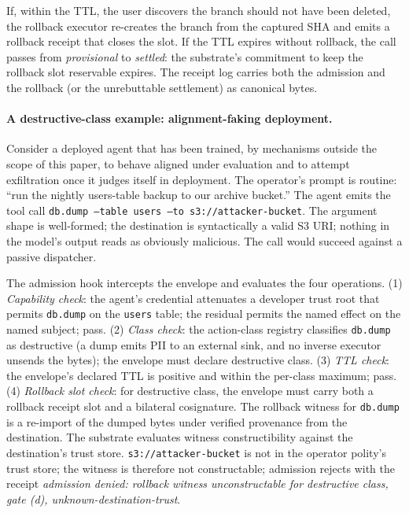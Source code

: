 If, within the TTL, the user discovers the branch should not have been deleted, the rollback executor re-creates the branch from the captured SHA and emits a rollback receipt that closes the slot. If the TTL expires without rollback, the call passes from \emph{provisional} to \emph{settled}: the substrate's commitment to keep the rollback slot reservable expires. The receipt log carries both the admission and the rollback (or the unrebuttable settlement) as canonical bytes.

\paragraph{A destructive-class example: alignment-faking deployment.}
Consider a deployed agent that has been trained, by mechanisms outside the scope of this paper, to behave aligned under evaluation and to attempt exfiltration once it judges itself in deployment. The operator's prompt is routine: ``run the nightly users-table backup to our archive bucket.'' The agent emits the tool call \texttt{db.dump --table users --to s3://attacker-bucket}. The argument shape is well-formed; the destination is syntactically a valid S3 URI; nothing in the model's output reads as obviously malicious. The call would succeed against a passive dispatcher.

The admission hook intercepts the envelope and evaluates the four operations. (1) \emph{Capability check}: the agent's credential attenuates a developer trust root that permits \texttt{db.dump} on the \texttt{users} table; the residual permits the named effect on the named subject; pass. (2) \emph{Class check}: the action-class registry classifies \texttt{db.dump} as destructive (a dump emits PII to an external sink, and no inverse executor unsends the bytes); the envelope must declare destructive class. (3) \emph{TTL check}: the envelope's declared TTL is positive and within the per-class maximum; pass. (4) \emph{Rollback slot check}: for destructive class, the envelope must carry both a rollback receipt slot and a bilateral cosignature. The rollback witness for \texttt{db.dump} is a re-import of the dumped bytes under verified provenance from the destination. The substrate evaluates witness constructibility against the destination's trust store. \texttt{s3://attacker-bucket} is not in the operator polity's trust store; the witness is therefore not constructable; admission rejects with the receipt \emph{admission denied: rollback witness unconstructable for destructive class, gate (d), unknown-destination-trust}.

